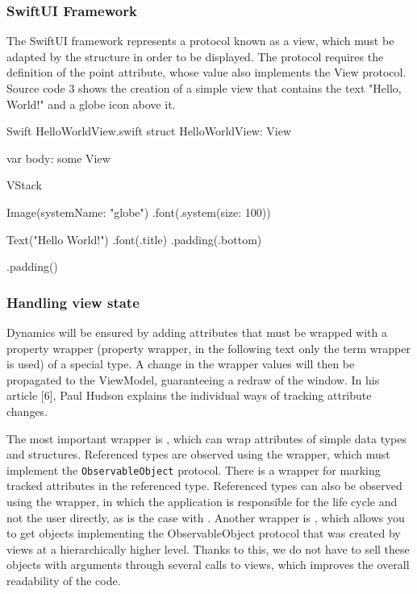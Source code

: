 \documentclass[
  biblatex = false,
  language=english,
  figures=false,
  sourcecodes,
  glossaries,
  index
]{kidiplom}
\begin{document}
\subsubsection{SwiftUI Framework}
The SwiftUI framework represents a protocol known as a view, which must be adapted by the structure in order to be displayed. The protocol requires the definition of the point attribute, whose value also implements the View protocol. Source code 3 shows the creation of a simple view that contains the text "Hello, World!" and a globe icon above it.

\FloatBarrier
\begin{kicode}{Swift}{} {HelloWorldView.swift}
struct HelloWorldView: View {
    var body: some View {
        VStack {
            Image(systemName: "globe")
                .font(.system(size: 100))
                
            Text("Hello World!")
                .font(.title)
                .padding(.bottom)
        }
        .padding()
    }
}
\end{kicode}
\FloatBarrier

\subsubsection{Handling view state}
Dynamics will be ensured by adding attributes that must be wrapped with a property wrapper (property wrapper, in the following text only the term wrapper is used) of a special type. A change in the wrapper values will then be propagated to the ViewModel, guaranteeing a redraw of the window. In his article [6], Paul Hudson explains the individual ways of tracking attribute changes.

The most important wrapper is , which can wrap attributes of simple data types and structures. Referenced types are observed using the  wrapper, which must implement the \texttt{ObservableObject} protocol. There is a  wrapper for marking tracked attributes in the referenced type. Referenced types can also be observed using the  wrapper, in which the application is responsible for the life cycle and not the user directly, as is the case with . Another wrapper is , which allows you to get objects implementing the ObservableObject protocol that was created by views at a hierarchically higher level. Thanks to this, we do not have to sell these objects with arguments through several calls to views, which improves the overall readability of the code.
\end{document}
